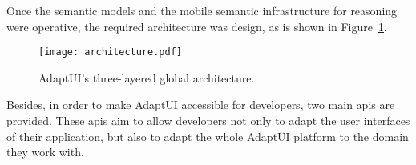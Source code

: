 Once the semantic models and the mobile semantic infrastructure for reasoning
were operative, the required architecture was design, as is shown in Figure~\ref{fig:architecture_discussion}.

\begin{figure}[H]
\centering
\texttt{[image: architecture.pdf]}
\caption{AdaptUI's three-layered global architecture.}
\label{fig:architecture_discussion}
\end{figure}

Besides, in order to make AdaptUI accessible for developers, two main \acp{api}
are provided. These \acp{api} aim to allow developers not only to adapt the
user interfaces of their application, but also to adapt the whole AdaptUI platform
to the domain they work with.


